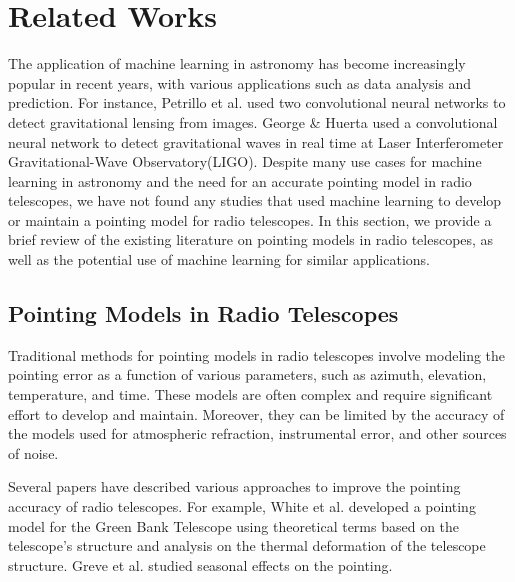 \section{Related Works}
The application of machine learning in astronomy has become increasingly popular in recent years, with various applications such as data analysis and prediction.
For instance, Petrillo et al. \cite{mlastgravlens} used two convolutional neural networks to detect gravitational lensing from images.
George \& Huerta \cite{mlastgravitationalwaves} used a convolutional neural network to detect gravitational waves in real time at Laser Interferometer Gravitational-Wave Observatory(LIGO).
Despite many use cases for machine learning in astronomy and the need for an accurate pointing model in radio telescopes,
we have not found any studies that used machine learning to develop or maintain a pointing model for radio telescopes.
In this section, we provide a brief review of the existing literature on pointing models in radio telescopes, as well as the potential use of machine learning for similar applications.

\subsection{Pointing Models in Radio Telescopes}
Traditional methods for pointing models in radio telescopes involve modeling the pointing error as a function of various parameters, such as azimuth, elevation, temperature, and time.
These models are often complex and require significant effort to develop and maintain.
Moreover, they can be limited by the accuracy of the models used for atmospheric refraction, instrumental error, and other sources of noise.

Several papers have described various approaches to improve the pointing accuracy of radio telescopes.
For example, White et al. \cite{whitegreen2022} developed a pointing model for the Green Bank Telescope using theoretical terms based on the telescope's structure and analysis on the thermal deformation of the telescope structure.
Greve et al. \cite{greve1996pointing} studied seasonal effects on the pointing.


